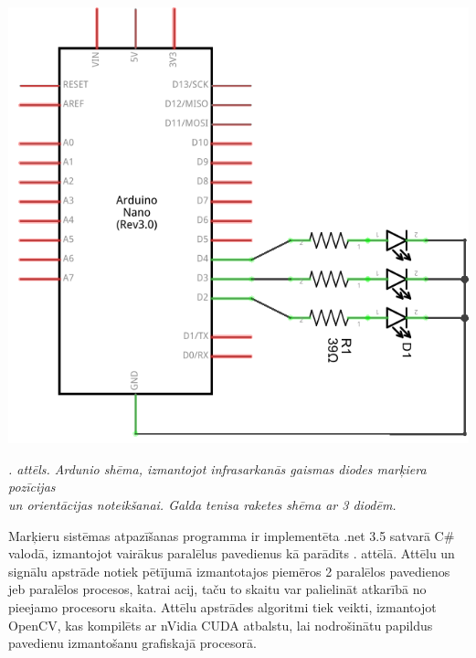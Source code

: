 \documentclass[12pt, a4paper, oneside, openright]{article}
\renewcommand{\thecimages}{\arabic{cimages}}
\renewcommand{\thectables}{\arabic{ctables}}
\begin{document}

\label{cimages:LeapVR_schem.png}
\vspace{10pt}
\begin{samepage}
\begin{center}
\includegraphics[width=0.5\columnwidth]{images/LeapVR_schem.png}
\begin{center}
\footnotesize{
\textit{\thecimages. attēls. Ardunio shēma, izmantojot infrasarkanās gaismas diodes marķiera pozīcijas \\ un orientācijas noteikšanai. Galda tenisa raketes shēma ar 3 diodēm.}}
\end{center}
\end{center}
\end{samepage}

\par
Marķieru sistēmas atpazīšanas programma ir implementēta .net 3.5 satvarā C\# valodā, 
izmantojot vairākus paralēlus pavedienus kā parādīts
. attēlā. Attēlu un signālu apstrāde notiek 
pētījumā izmantotajos piemēros 2 paralēlos pavedienos jeb paralēlos procesos, katrai acij, taču
to skaitu var palielināt atkarībā no pieejamo procesoru skaita.
Attēlu apstrādes algoritmi tiek veikti, izmantojot OpenCV, kas kompilēts ar
nVidia CUDA atbalstu, lai nodrošinātu papildus pavedienu izmantošanu grafiskajā procesorā.
\end{document}
